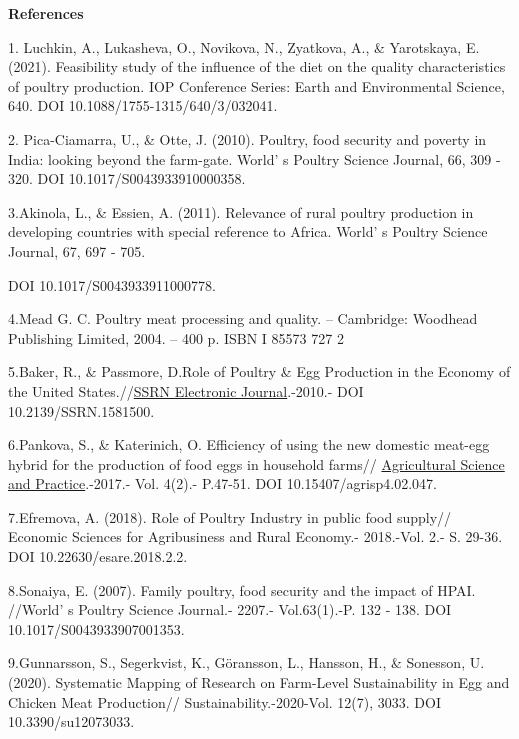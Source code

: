 \begin{center}
{\bfseries References}
\end{center}
\begin{references}

1. Luchkin, A., Lukasheva, O., Novikova, N., Zyatkova, A., \& Yarotskaya,
  E. (2021). Feasibility study of the influence of the diet on the
  quality characteristics of poultry production. IOP Conference Series:
  Earth and Environmental Science, 640. DOI
  10.1088/1755-1315/640/3/032041.

 2. Pica-Ciamarra, U., \& Otte, J. (2010). Poultry, food security and
  poverty in India: looking beyond the farm-gate.
  World' s Poultry Science Journal, 66, 309 - 320. DOI
  10.1017/S0043933910000358.


3.Akinola, L., \& Essien, A. (2011). Relevance of rural poultry
production in developing countries with special reference to Africa.
World' s Poultry Science Journal, 67, 697 - 705.

DOI 10.1017/S0043933911000778.

4.Mead G. C. Poultry meat processing and quality. -- Cambridge: Woodhead
Publishing Limited, 2004. -- 400 p. ISBN I 85573 727 2

5.Baker, R., \& Passmore, D.Role of Poultry \& Egg Production in the
Economy of the United
States.//\href{https://www.researchgate.net/journal/SSRN-Electronic-Journal-1556-5068?_tp=eyJjb250ZXh0Ijp7ImZpcnN0UGFnZSI6InB1YmxpY2F0aW9uIiwicGFnZSI6InB1YmxpY2F0aW9uIn19}{SSRN
Electronic Journal}.-2010.- DOI 10.2139/SSRN.1581500.

6.Pankova, S., \& Katerinich, O. Efficiency of using the new domestic
meat-egg hybrid for the production of food eggs in household farms//
\href{https://agrisp.com/index.php/agrisp/issue/view/11}{Agricultural
Science and Practice}.-2017.- Vol. 4(2).- P.47-51. DOI
10.15407/agrisp4.02.047.

7.Efremova, A. (2018). Role of Poultry Industry in public food supply//
Economic Sciences for Agribusiness and Rural Economy.- 2018.-Vol. 2.- S.
29-36. DOI 10.22630/esare.2018.2.2.

8.Sonaiya, E. (2007). Family poultry, food security and the impact of
HPAI. //World' s Poultry Science Journal.- 2207.-
Vol.63(1).-P. 132 - 138. DOI 10.1017/S0043933907001353.

9.Gunnarsson, S., Segerkvist, K., Göransson, L., Hansson, H., \&
Sonesson, U. (2020). Systematic Mapping of Research on Farm-Level
Sustainability in Egg and Chicken Meat Production//
Sustainability.-2020-Vol. 12(7), 3033. DOI 10.3390/su12073033.


\end{references}
